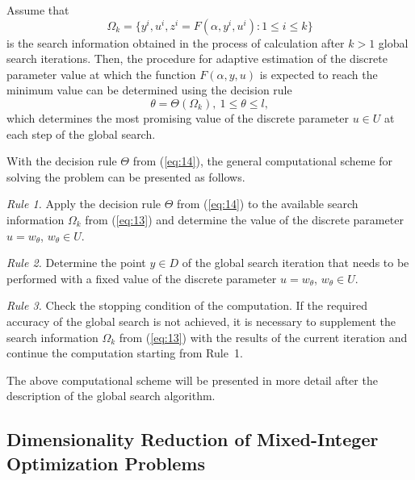 \documentclass{svproc}
\begin{document}
Assume that
\begin{equation}\label{eq:13}
 \Omega_k=\{ y^i,u^i,z^i=F(\alpha,y^i,u^i ) : 1\leq i\leq k \}
\end{equation}
is the search information obtained in the process of calculation after $k>1$ global search iterations. Then, the procedure for adaptive estimation of the discrete parameter value at which the function $F(\alpha,y,u)$ is expected to reach the minimum value can be determined using the decision rule
\begin{equation}\label{eq:14}
	\theta =\Theta(\Omega_k ),\ 1 \leq \theta \leq l,
\end{equation}
which determines the most promising value of the discrete parameter $u \in U$ at each step of the global search.

With the decision rule $\Theta$ from (\ref{eq:14}), the general computational scheme for solving the problem can be presented as follows.

\textit{Rule 1.} Apply the decision rule $\Theta$ from (\ref{eq:14}) to the available search information $\Omega_k$ from (\ref{eq:13})  and determine the value of the discrete parameter $u=w_\theta$, $w_\theta \in U$.

\textit{Rule 2.} Determine the point $y \in D$ of the global search iteration that needs to be performed with a fixed value of the discrete parameter $u=w_\theta$, $w_\theta \in U$.
			
\textit{Rule 3.} Check the stopping condition of the computation. If the required accuracy of the global search is not achieved, it is necessary to supplement the search information $\Omega_k$ from (\ref{eq:13}) with the results of the current iteration and continue the computation starting from Rule~1.

The above computational scheme will be presented in more detail after the description of the global search algorithm.

\subsection{Dimensionality Reduction of Mixed-Integer Optimization Problems} \label{subsec:32}
\end{document}
